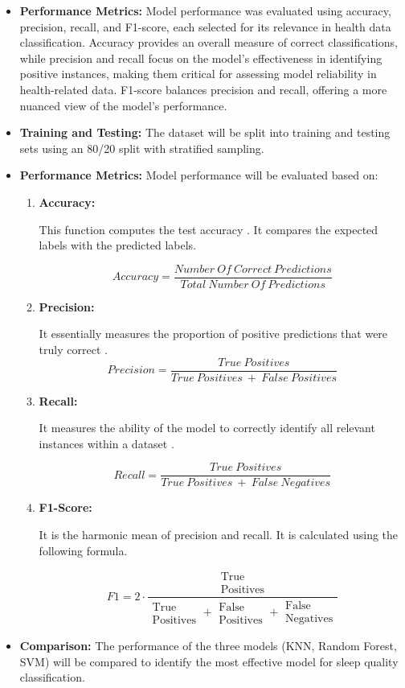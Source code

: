 \documentclass[conference]{IEEEtran}
\begin{document}
\begin{itemize}
\item \textbf{Performance Metrics:} Model performance was evaluated using accuracy, precision, recall, and F1-score, each selected for its relevance in health data classification. Accuracy provides an overall measure of correct classifications, while precision and recall focus on the model's effectiveness in identifying positive instances, making them critical for assessing model reliability in health-related data. F1-score balances precision and recall, offering a more nuanced view of the model’s performance.

\item \textbf{Training and Testing:} The dataset will be split into training and testing sets using an 80/20 split with stratified sampling. 

\item \textbf{Performance Metrics:} Model performance will be evaluated based on:
\begin{enumerate}
\item \textbf{Accuracy:}

This function computes the test accuracy \cite{accuracy_score}. It compares the expected labels with the predicted labels.

\[Accuracy=\frac{Number\ Of\ Correct\ Predictions}{Total\ Number\ Of\ Predictions}\]
\item  \textbf{Precision:} 

It essentially measures the proportion of positive predictions that were truly correct \cite{precision_score}.
\[Precision=\frac{True\ Positives}{True\ Positives\ +\ False\ Positives}\]

\item  \textbf{Recall:}

 It measures the ability of the model to correctly identify all relevant instances within a dataset \cite{recall_score}.

 \[Recall=\frac{True\ Positives}{True\ Positives\ +\ False\ Negatives}\]
 
 \item \textbf{F1-Score:}

 It is the harmonic mean of precision and recall\cite{sklearn_f1_score}. It is calculated using the following formula.
 
 \[F1 = 2 \cdot \frac{\substack{\text{True} \\ \text{Positives}}}{\substack{\text{True} \\ \text{Positives}} + \substack{\text{False} \\ \text{Positives}} + \substack{\text{False} \\ \text{Negatives}}}\]

\end{enumerate}
\item \textbf{Comparison:} The performance of the three models (KNN, Random Forest, SVM) will be compared to identify the most effective model for sleep quality classification.
\end{itemize}
\end{document}

